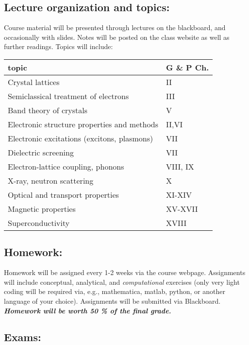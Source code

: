 \documentclass[11pt]{article}
\begin{document}
\subsection*{Lecture organization and topics: }

\noindent Course material will be presented through lectures on the blackboard, and occasionally with slides. Notes will be posted on the class website as well as further readings. Topics will include: 

\begin{center}
\begin{tabular}{ll}
  topic   & G \& P Ch.\\
\hline
  Crystal lattices   & II \\
  Semiclassical treatment of electrons   & III  \\
  Band theory of crystals & V \\
  Electronic structure properties and methods    & II,VI  \\
  Electronic excitations (excitons, plasmons) & VII \\
  Dielectric screening & VII  \\
  Electron-lattice coupling, phonons   & VIII, IX   \\
 X-ray, neutron scattering   & X   \\
 Optical and transport properties   & XI-XIV   \\
  Magnetic properties   & XV-XVII  \\
  Superconductivity  & XVIII   \\
\hline
\end{tabular}
\end{center}
 

\subsection*{Homework:}

\noindent Homework will be assigned every 1-2 weeks via the course webpage. Assignments will include conceptual, analytical, and \emph{computational} exercises (only very light coding will be required via, e.g., mathematica, matlab, python, or another language of your choice). Assignments will be submitted via Blackboard. \textbf{\textit{Homework will be worth 50 \% of the final grade.}}


\subsection*{Exams:}
\end{document}
